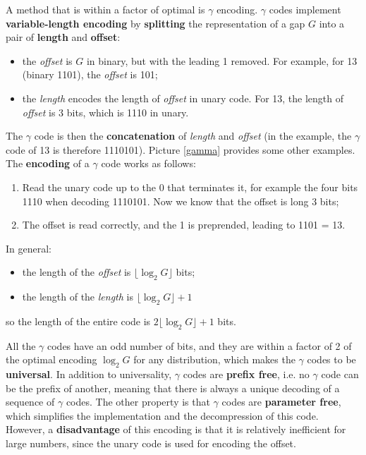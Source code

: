 A method that is within a factor of optimal is $\gamma$ encoding. $\gamma$ codes implement \textbf{variable-length encoding} by \textbf{splitting} the representation of a gap $G$ into a pair of \textbf{length} and \textbf{offset}:

\begin{itemize}
    \item the \textit{offset} is $G$ in binary, but with the leading 1 removed. For example, for 13 (binary 1101), the \textit{offset} is 101;
    \item the \textit{length} encodes the length of \textit{offset} in unary code. For 13, the length of \textit{offset} is 3 bits, which is 1110 in unary.
\end{itemize}

The $\gamma$ code is then the \textbf{concatenation} of \textit{length} and \textit{offset} (in the example, the $\gamma$ code of 13 is therefore 1110101). Picture \ref{gamma} provides some other examples. The \textbf{encoding} of a $\gamma$ code works as follows:

\begin{enumerate}
    \item Read the unary code up to the 0 that terminates it, for example the four bits 1110 when decoding 1110101. Now we know that the offset is long 3 bits;
    \item The offset is read correctly, and the 1 is preprended, leading to 1101 = 13.
\end{enumerate}

In general:

\begin{itemize}
    \item the length of the \textit{offset} is $\lfloor \log_2 G \rfloor$ bits;
    \item the length of the \textit{length} is $\lfloor \log_2 G \rfloor + 1$
\end{itemize}

so the length of the entire code is $2 \lfloor \log_2 G \rfloor + 1$ bits. 

All the $\gamma$ codes have an odd number of bits, and they are within a factor of 2 of the optimal encoding $\log_2 G$ for any distribution, which makes the $\gamma$ codes to be \textbf{universal}. In addition to universality, $\gamma$ codes are \textbf{prefix free}, i.e. no $\gamma$ code can be the prefix of another, meaning that there is always a unique decoding of a sequence of $\gamma$ codes. The other property is that $\gamma$ codes are \textbf{parameter free}, which simplifies the implementation and the decompression of this code. However, a \textbf{disadvantage} of this encoding is that it is relatively inefficient for large numbers, since the unary code is used for encoding the offset.

